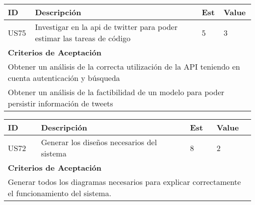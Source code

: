 \documentclass[a4paper,8pt]{article}
\begin{document}
\bigskip
\begin{tabular}{|p{1cm}|p{10cm}|p{1cm}|p{1cm}|}
\hline
\hline
\textbf{ID}&\textbf{Descripción}&\textbf{Est}&\textbf{Value}\\
\hline
\hline
US75&Investigar en la api de twitter para poder estimar las tareas de código&5&3\\
\hline
\hline
\multicolumn{4}{|p{13cm}|}{ \textbf{Criterios de Aceptación}} \\
\hline
\hline
\multicolumn{4}{|p{13cm}|}{Obtener un análisis de la correcta utilización de la API teniendo en cuenta autenticación y búsqueda}\\
\multicolumn{4}{|p{13cm}|}{Obtener un análisis de la factibilidad de un modelo para poder persistir información de tweets}\\
\hline
\hline
\end{tabular}


\bigskip
\begin{tabular}{|p{1cm}|p{10cm}|p{1cm}|p{1cm}|}
\hline
\hline
\textbf{ID}&\textbf{Descripción}&\textbf{Est}&\textbf{Value}\\
\hline
\hline
US72&Generar los diseños necesarios del sistema&8&2\\
\hline
\hline
\multicolumn{4}{|p{13cm}|}{ \textbf{Criterios de Aceptación}} \\
\hline
\hline
\multicolumn{4}{|p{13cm}|}{Generar todos los diagramas necesarios para explicar correctamente el funcionamiento del sistema.}\\
\hline
\hline
\end{tabular}
\end{document}
